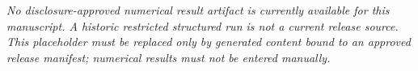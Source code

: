 \textit{No disclosure-approved numerical result artifact is currently available
for this manuscript. A historic restricted structured run is not a current
release source. This placeholder must be replaced only by generated content
bound to an approved release manifest; numerical results must not be entered
manually.}
